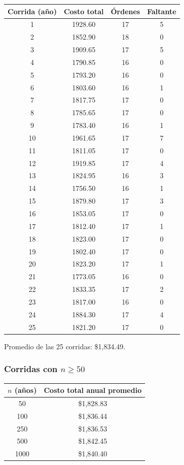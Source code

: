 \begin{center}
\small
\begin{tabular}{cccc}
\toprule
Corrida (año) & Costo total & Órdenes & Faltante \\
\midrule
1  & 1928.60 & 17 & 5 \\
2  & 1852.90 & 18 & 0 \\
3  & 1909.65 & 17 & 5 \\
4  & 1790.85 & 16 & 0 \\
5  & 1793.20 & 16 & 0 \\
6  & 1803.60 & 16 & 1 \\
7  & 1817.75 & 17 & 0 \\
8  & 1785.65 & 17 & 0 \\
9  & 1783.40 & 16 & 1 \\
10 & 1961.65 & 17 & 7 \\
11 & 1811.05 & 17 & 0 \\
12 & 1919.85 & 17 & 4 \\
13 & 1824.95 & 16 & 3 \\
14 & 1756.50 & 16 & 1 \\
15 & 1879.80 & 17 & 3 \\
16 & 1853.05 & 17 & 0 \\
17 & 1812.40 & 17 & 1 \\
18 & 1823.00 & 17 & 0 \\
19 & 1802.40 & 17 & 0 \\
20 & 1823.20 & 17 & 1 \\
21 & 1773.05 & 16 & 0 \\
22 & 1833.35 & 17 & 2 \\
23 & 1817.00 & 16 & 0 \\
24 & 1884.30 & 17 & 4 \\
25 & 1821.20 & 17 & 0 \\
\bottomrule
\end{tabular}
\end{center}

Promedio de las 25 corridas: \$1,834.49.

\subsubsection{\texorpdfstring{Corridas con $n \geq 50$}{Corridas con n mayor igual 50}}

\begin{center}
\begin{tabular}{cc}
\toprule
$n$ (años) & Costo total anual promedio \\
\midrule
50   & \$1,828.83 \\
100  & \$1,836.44 \\
250  & \$1,836.53 \\
500  & \$1,842.45 \\
1000 & \$1,840.40 \\
\bottomrule
\end{tabular}
\end{center}

